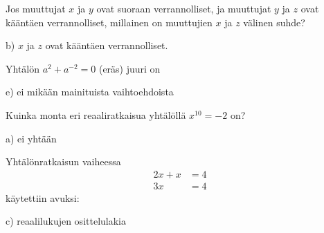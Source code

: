 \begin{multicols}{2}
\begin{tehtava}
Jos muuttujat $x$ ja $y$ ovat suoraan verrannolliset, ja muuttujat $y$ ja $z$ ovat kääntäen verrannolliset, millainen on muuttujien $x$ ja $z$ välinen suhde?
	\begin{vastaus}
b) $x$ ja $z$ ovat kääntäen verrannolliset.
	\end{vastaus}
\end{tehtava}

\begin{tehtava}
Yhtälön $a^2+a^{-2}=0$ (eräs) juuri on
	\begin{vastaus}
e) ei mikään mainituista vaihtoehdoista
	\end{vastaus}
\end{tehtava}

\begin{tehtava}
Kuinka monta eri reaaliratkaisua yhtälöllä $x^{10}=-2$ on?
	\begin{vastaus}
a) ei yhtään
	\end{vastaus}
\end{tehtava}

\begin{tehtava}
Yhtälönratkaisun vaiheessa
\begin{align*}
2x+x&=4 \\
3x&=4
\end{align*}
käytettiin avuksi:
	\begin{vastaus}
	c) reaalilukujen osittelulakia
	\end{vastaus}
\end{tehtava}

%
%	
%
%
%	
%
%
%	


\end{multicols}
